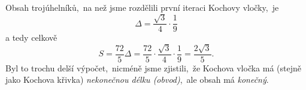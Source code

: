 Obsah trojúhelníků,~na než jsme rozdělili první iteraci Kochovy vločky,~je
\[\Delta=\dfrac{\sqrt{3}}{4}\cdot\dfrac{1}{9}\]
a tedy celkově
\[S=\dfrac{72}{5}\Delta=\dfrac{72}{5}\cdot\dfrac{\sqrt{3}}{4}\cdot\dfrac{1}{9}=\dfrac{2\sqrt{3}}{5}.\]
Byl to trochu delší výpočet,~nicméně jsme zjistili,~že Kochova vločka má (stejně jako Kochova křivka) \emph{nekonečnou délku (obvod)},~ale obsah má \emph{konečný}.
